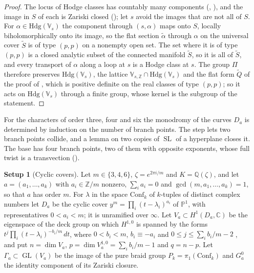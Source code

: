\documentclass[11pt,reqno]{amsart}
\theoremstyle{plain}
\theoremstyle{definition}
\newtheorem{setupenv}[theorem]{Setup}
\theoremstyle{remark}
\newcommand{\QQ}{\mathbb{Q}}
\newcommand{\ZZ}{\mathbb{Z}}
\newcommand{\CC}{\mathbb{C}}
\newcommand{\PP}{\mathbb{P}}
\newcommand{\Hdg}{\mathrm{Hdg}}
\DeclareMathOperator{\GL}{GL}
\DeclareMathOperator{\SL}{SL}
\begin{document}
\begin{proof}
The locus of Hodge classes has countably many components
(\cite[Definition~B.3]{paperI}, \cite[Lemma~B.4]{paperI}), and the image in $S$ of
each is Zariski closed (\cite[Theorem~B.6]{paperI}); let $s$ avoid the images that are
not all of $S$. For $\alpha\in\Hdg(\mathbb{V}_{s})$ the component through
$(s,\alpha)$ maps onto $S$, locally biholomorphically onto its image, so the
flat section $\tilde\alpha$ through $\alpha$ on the universal cover $\tilde S$
is of type $(p,p)$ on a nonempty open set. The set where it is of type
$(p,p)$ is a closed analytic subset of the connected manifold $\tilde S$, so it
is all of $\tilde S$, and every transport of $\alpha$ along a loop at $s$ is a
Hodge class at $s$. The group $\Pi$ therefore preserves
$\Hdg(\mathbb{V}_{s})$, the lattice $\mathbb{V}_{s,\ZZ}\cap\Hdg(\mathbb{V}_{s})$
and the flat form $\tilde Q$ of the proof of \cite[Lemma~B.5]{paperI}, which is
positive definite on the real classes of type $(p,p)$; so it acts on
$\Hdg(\mathbb{V}_{s})$ through a finite group, whose kernel is the subgroup
of the statement.
\end{proof}

For the characters of order three, four and six the monodromy of the
curves $D_{a}$ is determined by induction on the number of branch points. The
step lets two branch points collide, and a lemma on two copies of $\SL$ of a
hyperplane closes it. The base has four branch points, two of them with
opposite exponents, whose full twist is a transvection
().

\begin{setupenv}[Cyclic covers]\label{setup:cyclic}
Let $m\in\{3,4,6\}$, $\zeta=e^{2\pi i/m}$ and $K=\QQ(\zeta)$, and let
$a=(a_{1},\dots,a_{k})$ with $a_{i}\in\ZZ/m$ nonzero, $\sum_{i}a_{i}=0$ and
$\gcd(m,a_{1},\dots,a_{k})=1$, so that $a$ has order $m$. For $\lambda$ in
the space $\mathrm{Conf}_{k}$ of $k$-tuples of distinct complex numbers let
$D_{a}$ be the cyclic cover $y^{m}=\prod_{i}(t-\lambda_{i})^{a_{i}}$ of
$\PP^{1}$, with representatives $0<a_{i}<m$; it is unramified over
$\infty$. Let $V_{a}\subset H^{1}(D_{a},\CC)$ be the eigenspace of the deck
group on which $H^{1,0}$ is spanned by the forms
$t^{j}\prod_{i}(t-\lambda_{i})^{-b_{i}/m}\,dt$, where $0<b_{i}<m$, $b_{i}\equiv
-a_{i}$ and $0\le j\le\sum_{i}b_{i}/m-2$ \cite[\S2]{DM86}, and put
$n=\dim V_{a}$,
$p=\dim V_{a}^{1,0}=\sum_{i}b_{i}/m-1$ and $q=n-p$. Let $\Gamma_{a}\subset
\GL(V_{a})$ be the image of the pure braid group
$P_{k}=\pi_{1}(\mathrm{Conf}_{k})$ and $G_{a}^{0}$ the identity component of
its Zariski closure.
\end{setupenv}
\end{document}

